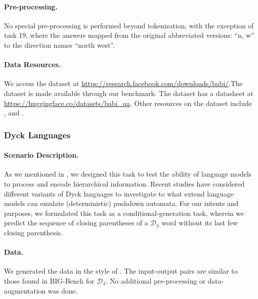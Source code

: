 \paragraph{Pre-processing.} No special pre-processing is performed beyond tokenization, with the exception of task 19, where the answers mapped from the original abbreviated versions: ``n, w'' to the direction names ``north west''.

\paragraph{Data Resources.}
We access the dataset at \url{https://research.facebook.com/downloads/babi/}.The dataset is made available through our benchmark. The dataset has a datasheet at \url{https://huggingface.co/datasets/babi_qa}. Other resources on the dataset include \citep{kumar2016ask}, \citep{weston2016dialog} and \citep{dehghani2018universal}. 



\subsubsection{Dyck Languages}
\label{app:dyck}
\paragraph{Scenario Description.} 
As we mentioned in , we designed this task to test the ability of language models to process and encode hierarchical information. 
Recent studies \citep[][\textit{inter alia}]{sennhauser2018evaluating,hao2018context,skachkova2018closing,suzgun2019lstm,suzgun2019memory,hahn2020theoretical,bhattamishra2020ability,hewitt2020rnns,ebrahimi2020can,merrill2021formal} have considered different variants of Dyck languages to investigate to what extend language models can emulate (deterministic) pushdown automata. 
For our intents and purposes, we formulated this task as a conditional-generation task, wherein we predict the sequence of closing parentheses of a $\mathcal{D}_3$ word without its last few closing parenthesis. 

\paragraph{Data.} We generated the data in the style of \citet{suzgun2019memory}. The input-output pairs are similar to those found in BIG-Bench \citep{srivastava2022bigbench} for $\mathcal{D}_4$. No additional pre-processing or data-augmentation was done. 

